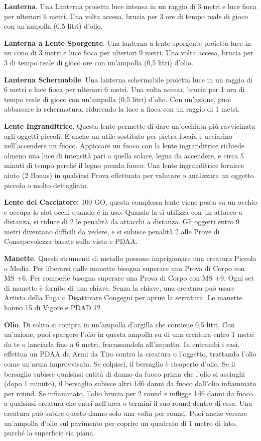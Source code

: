\documentclass[12pt,a4paper,twoside,openany]{book}
\begin{document}
\begin{multicols}{2}
\textbf{Lanterna}. Una Lanterna proietta luce intensa in un raggio di 3 metri e luce fioca per ulteriori 6 metri. Una volta accesa, brucia per 3 ore di tempo reale di gioco con un’ampolla (0,5 litri) d’olio.

\textbf{Lanterna a Lente Sporgente}. Una lanterna a lente sporgente proietta luce in un cono di 3 metri e luce fioca per ulteriori 9 metri. Una volta accesa, brucia per 3 di tempo reale di gioco ore con un’ampolla (0,5 litri) d’olio.

\textbf{Lanterna Schermabile}. Una lanterna schermabile proietta luce in un raggio di 6 metri e luce fioca per ulteriori 6 metri. Una volta accesa, brucia per 1 ora di tempo reale di gioco con un’ampolla (0,5 litri) d’olio. Con un’azione, puoi abbassare la schermatura, riducendo la luce a fioca con un raggio di 1 metri.

\textbf{Lente Ingranditrice}. Questa lente permette di dare un’occhiata più ravvicinata agli oggetti piccoli. È anche un utile sostituto per pietra focaia e acciarino nell’accendere un fuoco. Appiccare un fuoco con la lente ingranditrice richiede almeno una luce di intensità pari a quella solare, legna da accendere, e circa 5 minuti di tempo perché il legno prenda fuoco. Una lente ingranditrice fornisce aiuto (2 Bonus) in qualsiasi Prova effettuata per valutare o analizzare un oggetto piccolo o molto dettagliato. 

\textbf{Lente del Cacciatore:} 100 GO, questa complessa lente viene posta su un occhio e occupa lo slot occhi quando è in uso. Quando la si utilizza con un attacco a distanza, si riduce di 2 le penalità da attacchi a distanza. Gli oggetti entro 9 metri diventano difficili da vedere, e si subisce penalità 2 alle Prove di Consapevolezza basate sulla vista e PDAA.

\textbf{Manette}. Questi strumenti di metallo possono imprigionare una creatura Piccola o Media. Per liberarsi dalle manette bisogna superare una Prova di Corpo con MS +6. Per romperle bisogna superare una Prova di Corpo con MS +9. Ogni set di manette è fornito di una chiave. Senza la chiave, una creatura può usare Artista della Fuga o Disattivare Congegni per aprire la serratura. Le manette hanno 15 di Vigore e PDAD 12

\textbf{Olio}. Di solito si compra in un’ampolla d’argilla che contiene 0,5 litri. Con un’azione, puoi spargere l’olio in questa ampolla su di una creatura entro 1 metri da te o lanciarla fino a 6 metri, fracassandola all’impatto. In entrambi i casi, effettua un PDAA da Armi da Tiro contro la creatura o l’oggetto, trattando l’olio come un’arma improvvisata. Se colpisci, il bersaglio è ricoperto d’olio. Se il bersaglio subisse qualsiasi entità di danno da fuoco prima che l’olio si asciughi (dopo 1 minuto), il bersaglio subisce altri 1d6 danni da fuoco dall’olio infiammato per round. Se infiammato, l’olio brucia per 2 round e infligge 1d6 danni da fuoco a qualsiasi creatura che entri nell’area o termini il suo round dentro di essa. Una creatura può subire questo danno solo una volta per round. Puoi anche versare un’ampolla d’olio sul pavimento per coprire un quadrato di 1 metro di lato, purché la superficie sia piana.


\end{multicols}
\end{document}
